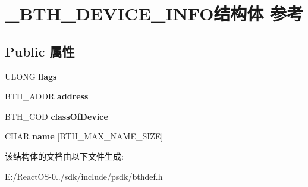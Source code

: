 \hypertarget{struct___b_t_h___d_e_v_i_c_e___i_n_f_o}{}\section{\+\_\+\+B\+T\+H\+\_\+\+D\+E\+V\+I\+C\+E\+\_\+\+I\+N\+F\+O结构体 参考}
\label{struct___b_t_h___d_e_v_i_c_e___i_n_f_o}
\subsection*{Public 属性}
\begin{DoxyCompactItemize}
\item 
\mbox{\label{struct___b_t_h___d_e_v_i_c_e___i_n_f_o_ac9449761ba0fbd0874ed714232a01b09}} 
U\+L\+O\+NG {\bfseries flags}
\item 
\mbox{\label{struct___b_t_h___d_e_v_i_c_e___i_n_f_o_a670680fe523744137288b38f2940fa72}} 
B\+T\+H\+\_\+\+A\+D\+DR {\bfseries address}
\item 
\mbox{\label{struct___b_t_h___d_e_v_i_c_e___i_n_f_o_a010c5792406ee61c8eea00ef7277f477}} 
B\+T\+H\+\_\+\+C\+OD {\bfseries class\+Of\+Device}
\item 
\mbox{\label{struct___b_t_h___d_e_v_i_c_e___i_n_f_o_a427b2ca6d9748c54a599e0b0c40837d3}} 
C\+H\+AR {\bfseries name} \mbox{[}B\+T\+H\+\_\+\+M\+A\+X\+\_\+\+N\+A\+M\+E\+\_\+\+S\+I\+ZE\mbox{]}
\end{DoxyCompactItemize}


该结构体的文档由以下文件生成\+:\begin{DoxyCompactItemize}
\item 
E\+:/\+React\+O\+S-\/0../sdk/include/psdk/bthdef.\+h\end{DoxyCompactItemize}
